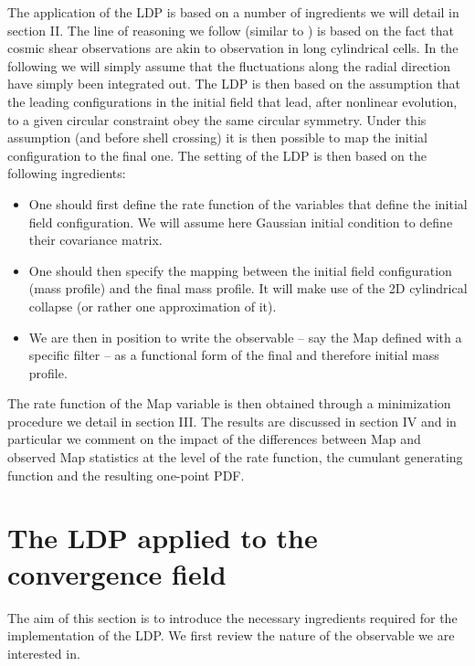 \documentclass[twocolumn,aps,reprint, nofootinbib]{revtex4}
\begin{document}
The application of the LDP is based on a number of ingredients we will detail in section II. The line of reasoning we follow (similar to \cite{bernardeau2000construction}) is based on the fact that cosmic shear observations are akin to observation in long cylindrical cells. In the following we will simply assume that the fluctuations along the radial direction have simply been integrated out. The LDP is then based on the assumption that the leading configurations in the initial field that lead, after nonlinear evolution, to a  given circular constraint obey the same circular symmetry. Under this assumption (and before shell crossing) it is then possible to map the initial configuration to the final one.
The setting of the LDP is then based on the following ingredients:
\begin{itemize}
\item One should first define the rate function of the variables that define  the initial field configuration. We will assume here Gaussian initial condition to define their covariance matrix.
\item One should then specify the mapping between the initial field configuration (mass profile) and the final mass profile. It will make use of the 2D cylindrical collapse (or rather one approximation of it).
\item We are then in position to write the observable -- say the Map defined with a specific filter --  as a functional form of the final and therefore initial mass profile.
\end{itemize}

The rate function of the Map variable is then obtained through a minimization procedure we detail in section III.
The results are discussed in section IV and in particular we comment on the impact of the differences between Map and observed Map
statistics at the level of the rate function, the cumulant generating function and the resulting one-point PDF.

\section{The LDP applied to the convergence field}

The aim of this section is to introduce the necessary ingredients required for the implementation of the LDP. We first review 
the nature of the observable we are interested in.

\end{document}
